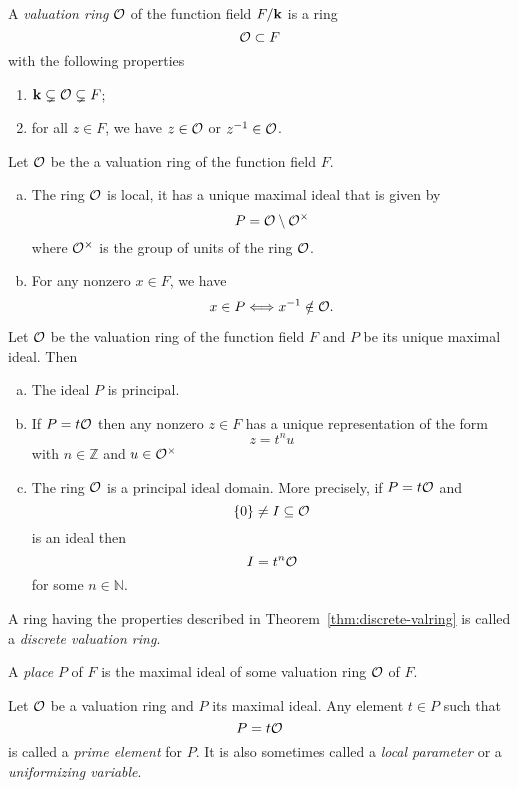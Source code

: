 \begin{defi}
  A \emph{valuation ring} $\mathcal{O}$ of the function field $F/\mathbf{k}$ is a ring 
  \[
    \mathcal{O} \subset F
  \]
  with the following properties
  \begin{enumerate}
    \item $\mathbf{k}\subsetneq\mathcal{O}\subsetneq F$;
    \item for all $z\in F$, we have $z\in\mathcal{O}$ or $z^{-1}\in\mathcal{O}$.
  \end{enumerate}
\end{defi}
\begin{prop}
  \label{prop:valring}
Let $\mathcal{O}$ be the a valuation ring of the function field $F$. 
\begin{enumerate}[(a)]
    \item The ring $\mathcal{O}$ is local, \ie it has a unique maximal ideal that is given
      by
      \[
        P = \mathcal{O}\setminus\mathcal{O}^\times
      \]
      where $\mathcal{O}^\times$ is the group of units of the ring $\mathcal{O}$.
    \item \label{cond:valring} For any nonzero $x\in F$, we have
      \[
        x\in P\Longleftrightarrow x^{-1}\notin\mathcal{O}.
      \]
\end{enumerate}
\end{prop}
\begin{thm}
  \label{thm:discrete-valring}
 Let $\mathcal{O}$ be the valuation ring of the function field $F$ and $P$ be its unique
 maximal ideal. Then
 \begin{enumerate}[(a)]
   \item The ideal $P$ is principal.
   \item If $P=t\mathcal{O}$ then any nonzero $z\in F$ has a unique representation of
     the form
     \[
       z = t^n u
     \]
     with $n\in\mathbb{Z}$ and $u\in\mathcal{O}^\times$
   \item The ring $\mathcal{O}$ is a principal ideal domain. More precisely, if $P=t\mathcal{O}$
     and
     \[
       \left\{ 0 \right\}\neq I\subseteq\mathcal{O}
     \]
     is an ideal then
     \[
       I = t^n\mathcal{O}
     \]
     for some $n\in\mathbb{N}$.
 \end{enumerate}
\end{thm}
A ring having the properties described in Theorem~\ref{thm:discrete-valring} is
called a \emph{discrete valuation ring}.
\begin{defi}[Place]
  A \emph{place} $P$ of $F$ is the maximal ideal of some valuation ring $\mathcal{O}$ of $F$.
\end{defi}
\begin{defi}
  Let $\mathcal{O}$ be a valuation ring and $P$ its maximal ideal. Any element $t\in P$
  such that
  \[
    P = t\mathcal{O}
  \]
  is called a \emph{prime element} for $P$. It is also sometimes called a
  \emph{local parameter} or a \emph{uniformizing variable}.
\end{defi}
